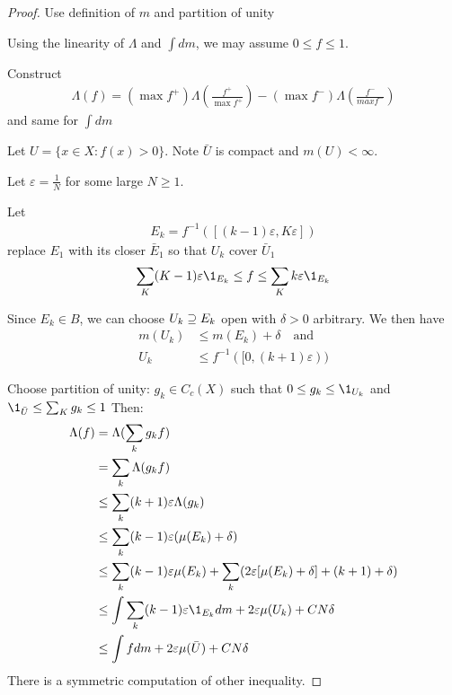 \begin{proof}
	Use definition of $m$ and partition of unity

	Using the linearity of $\Lambda$ and  $\int dm$, we may assume $0 \leq f \leq 1.$

	Construct 
	 \begin{align*}
	    \Lambda (f) = ( \max f^+ ) \Lambda \left(\frac{f^+}{\max f^+}\right) - (\max f^- ) \Lambda \left(\frac{f^-}{max f^-} \right)
	\end{align*} 
	and same for $\int dm$


	Let $U = \{x \in X : f(x) > 0\}$. Note  $\bar{U}$ is compact and $m(U) < \infty$.

	Let  $\varepsilon = \frac{1}{N}$ for some large  $N \geq 1$.

	Let
	\begin{align*}
		E_k = f^{-1}\left( [ (k-1) \varepsilon, K \varepsilon]\right)
	\end{align*}
	replace $E_1$ with its closer $\bar{E}_1$ so that $U_k$ cover $\bar{U}_1$
	 \begin{align*}
	\sum_{K} (K -1) \varepsilon \1_{E_k} \leq f \leq \sum_{K} k \varepsilon \1_{E_k}
	\end{align*} 

	Since $E_k \in B$, we can choose $U_k \supseteq E_k$ open with $\delta >0 $ arbitrary.
	We then have
	\begin{align*}
		m(U_k) &\leq m(E_k) + \delta \quad \text{and} \\
		U_k &\leq f^{-1} ( [ 0, (k+1)\varepsilon))
	\end{align*} 

	Choose partition of unity: $g_k \in C_c(X)$ such that  $0 \leq g_k \leq \1_{U_k}$ and \\
	$\1_{\bar{U}} \leq \sum_{K} g_k \leq 1$ 
	Then:
	\begin{align*}
	\Lambda(f) &= \Lambda( \sum_{k} g_k f) \\
			   &=  \sum_{k} \Lambda( g_k f) \\
			   &\leq  \sum_{k} (k+1) \varepsilon \Lambda( g_k ) \\
			   &\leq  \sum_{k} (k-1) \varepsilon ( \mu( E_k ) + \delta ) \\
			   &\leq \sum_{k} (k-1) \varepsilon \mu( E_k ) + \sum_{k} (2 \varepsilon [ \mu (E_k) + \delta] + (k+1) + \delta) \\
			   &\leq \int \sum_{k} (k-1) \varepsilon \1_{E_k} dm + 2 \varepsilon  \mu( U_k ) + C N \delta  \\
			   &\leq \int f dm + 2 \varepsilon  \mu(\bar{U}) + C N \delta  \\
	\end{align*} There is a symmetric computation of other inequality.
\end{proof}





